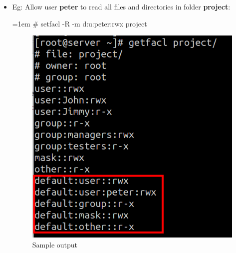 \begin{flushleft}
\begin{itemize}
	\item Eg: Allow user \textbf{peter} to read all files and directories in folder \textbf{project}:
	\bigskip
	\begin{tcolorbox}[breakable,notitle,boxrule=-0pt,colback=black,colframe=black]
		\color{green}
		\font=1em
		\# setfacl -R -m d:u:peter:rwx  project
		\font=4pt
	\end{tcolorbox}

	\begin{figure}[h!]
		\centering
		\includegraphics[scale=0.4]{content/chapter6/images/getfacl2.png}
		\caption{Sample output}
		\label{fig:acl_example2}
	\end{figure}
	

\newpage


\end{itemize}
\end{flushleft}
